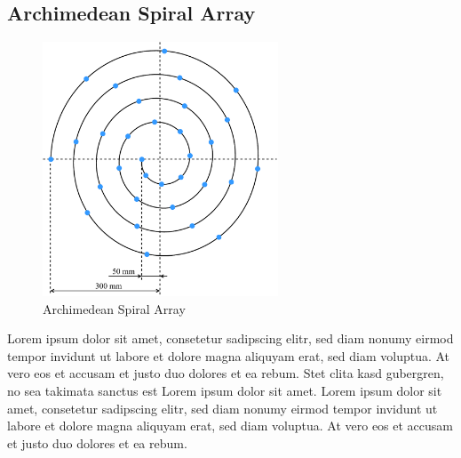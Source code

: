 \subsection{Archimedean Spiral Array}
\begin{minipage}{\linewidth}
	\begin{figure}
		\vspace{-0.8cm}
		\includegraphics[width=7cm]{images/5_array_evaluation/prototype_array_archimedian_spiral.pdf}
		\centering
		\caption{Archimedean Spiral Array}
		\label{fig:prototype_array_archimedian_spiral}
	\end{figure}
	Lorem ipsum dolor sit amet, consetetur sadipscing elitr, sed diam nonumy eirmod tempor invidunt ut labore et dolore magna aliquyam erat, sed diam voluptua.
	At vero eos et accusam et justo duo dolores et ea rebum. Stet clita kasd gubergren, no sea takimata sanctus est Lorem ipsum dolor sit amet.
	Lorem ipsum dolor sit amet, consetetur sadipscing elitr, sed diam nonumy eirmod tempor invidunt ut labore et dolore magna aliquyam erat, sed diam voluptua.
	At vero eos et accusam et justo duo dolores et ea rebum.
\end{minipage}
\newpage



